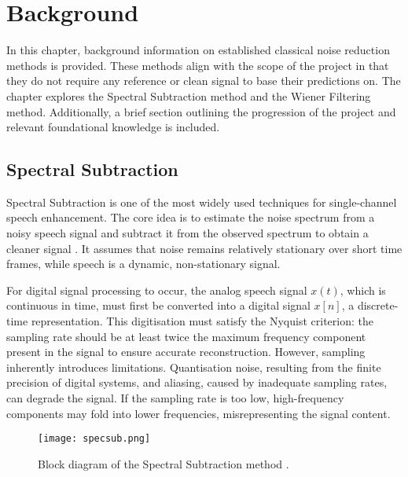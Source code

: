\graphicspath{{content/chapters/2_background/figures/}}
\chapter{Background}
\label{chp:background}

In this chapter, background information on established classical noise reduction methods is provided. These methods align with the scope of the project in that they do not require any reference or clean signal to base their predictions on. The chapter explores the Spectral Subtraction method and the Wiener Filtering method. Additionally, a brief section outlining the progression of the project and relevant foundational knowledge is included.

\section{Spectral Subtraction}
\label{sec:spectral_subtraction}

Spectral Subtraction is one of the most widely used techniques for single-channel speech enhancement. The core idea is to estimate the noise spectrum from a noisy speech signal and subtract it from the observed spectrum to obtain a cleaner signal \cite{loizou2013speech}. It assumes that noise remains relatively stationary over short time frames, while speech is a dynamic, non-stationary signal.

For digital signal processing to occur, the analog speech signal \(x(t)\), which is continuous in time, must first be converted into a digital signal \(x[n]\), a discrete-time representation. This digitisation must satisfy the Nyquist criterion: the sampling rate should be at least twice the maximum frequency component present in the signal to ensure accurate reconstruction. However, sampling inherently introduces limitations. Quantisation noise, resulting from the finite precision of digital systems, and aliasing, caused by inadequate sampling rates, can degrade the signal. If the sampling rate is too low, high-frequency components may fold into lower frequencies, misrepresenting the signal content.

\begin{figure}[h]
    \centering
    \texttt{[image: specsub.png]}
    \caption{\label{fig:SSBlock} Block diagram of the Spectral Subtraction method \cite{dubey2016evaluation}.}
\end{figure}

